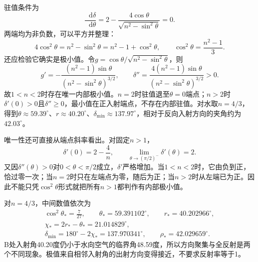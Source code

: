 \documentclass[UTF8,fontset=fandol,a4paper,11pt]{ctexart}
\newcommand{\dd}{\mathop{}\!\mathrm{d}}
\begin{document}
驻值条件为
\[
\frac{\dd\delta}{\dd\theta}
=2-\frac{4\cos\theta}{\sqrt{n^2-\sin^2\theta}}=0.
\]
两端均为非负数，可以平方并整理：
\[
4\cos^2\theta=n^2-\sin^2\theta
=n^2-1+\cos^2\theta,
\qquad
\boxed{\cos^2\theta=\frac{n^2-1}{3}}.
\]
还应检验它确实是极小值。令$g=\cos\theta/\sqrt{n^2-\sin^2\theta}$，则
\[
g'=-\frac{(n^2-1)\sin\theta}
{(n^2-\sin^2\theta)^{3/2}},
\qquad
\delta''=\frac{4(n^2-1)\sin\theta}
{(n^2-\sin^2\theta)^{3/2}}>0.
\]
故$1<n<2$时存在唯一内部极小值。$n=2$时驻值退至$\theta=0$端点；$n>2$时$\delta'(0)>0$且$\delta''\ge0$，最小值在正入射端点，不存在内部驻值。对水取$n=4/3$，得到$\theta\approx59.39^\circ$、$r\approx40.20^\circ$、$\delta_{\min}\approx137.97^\circ$，相对于反向入射方向的夹角约为$42.03^\circ$。


唯一性还可直接从端点斜率看出。对固定$n>1$，
\[
\delta'(0)=2-\frac4n,\qquad
\lim_{\theta\to(\pi/2)^-}\delta'(\theta)=2 .
\]
又因$\delta''(\theta)>0$对$0<\theta<\pi/2$成立，$\delta'$严格增加。当$1<n<2$时，它由负到正，恰过零一次；当$n=2$时只在左端点为零，随后为正；当$n>2$时从左端已为正。因此不能只凭$\cos^2\theta$形式就把所有$n>1$都判作有内部极小值。

对$n=4/3$，中间数值依次为
\[
\begin{gathered}
\cos^2\theta_*=\frac7{27},\qquad
\theta_*=59.391102^\circ,\qquad
r_*=40.202966^\circ,\\
\chi_*=2r_*-\theta_*=21.014829^\circ,\\
\delta_{\min}=180^\circ-2\chi_*
=137.970341^\circ,\qquad
\rho_*=42.029659^\circ.
\end{gathered}
\]
B处入射角40.20度仍小于水向空气的临界角48.59度，所以方向聚集与全反射是两个不同现象。极值来自相邻入射角的出射方向变得接近，不要求反射率等于1。
\end{document}
